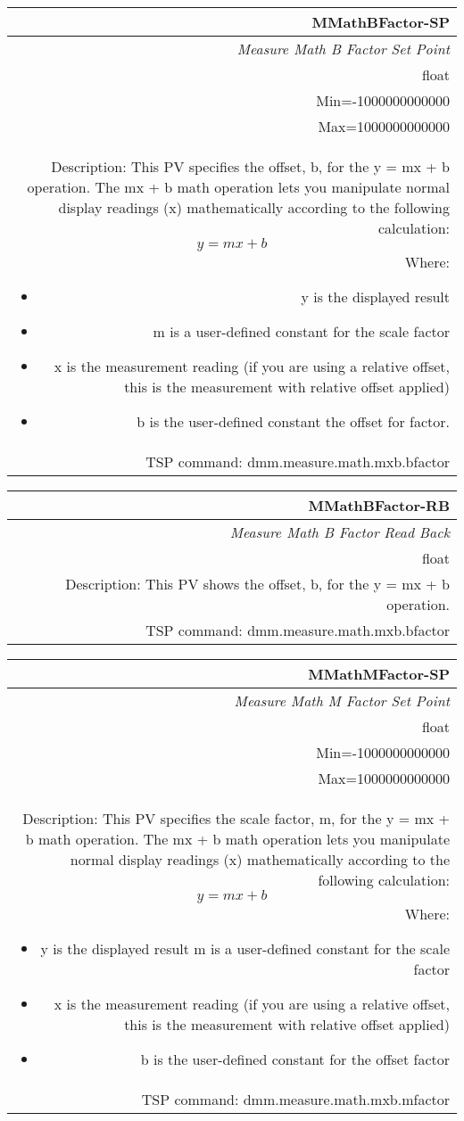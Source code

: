 \documentclass[openany]{article}
\begin{document}
		\begin{tabular}{N}
			\hline
			\bfseries MMathBFactor-SP\label{pv:mmathbfactor-sp} \\ \hline
			\emph{Measure Math B Factor Set Point} \\
			float \\
			Min=-1000000000000 \\
			Max=1000000000000 \\
			Description: This PV specifies the offset, b, for the y = mx + b operation. The mx + b math operation lets you manipulate normal display readings (x) mathematically according to the following calculation: $$y = mx + b$$ Where: \begin{itemize} \item y is the displayed result \item[] m is a user-defined constant for the scale factor \item x is the measurement reading (if you are using a relative offset, this is the measurement with relative offset applied) \item b is the user-defined constant the offset for factor. \end{itemize} \\
			TSP command: dmm.measure.math.mxb.bfactor
		\end{tabular}

		\begin{tabular}{N}
			\hline
			\bfseries MMathBFactor-RB\label{pv:mmathbfactor-rb} \\ \hline
			\emph{Measure Math B Factor Read Back} \\
			float \\
			Description: This PV shows the offset, b, for the y = mx + b operation. \\
			TSP command: dmm.measure.math.mxb.bfactor
		\end{tabular}

		\begin{tabular}{N}
			\hline
			\bfseries MMathMFactor-SP\label{pv:mmathmfactor-sp} \\ \hline
			\emph{Measure Math M Factor Set Point} \\
			float \\
			Min=-1000000000000 \\
			Max=1000000000000 \\
			Description: This PV specifies the scale factor, m, for the y = mx + b math operation. The mx + b math operation lets you manipulate normal display readings (x) mathematically according to the following calculation: $$y = mx + b$$ Where: \begin{itemize} \item y is the displayed result  m is a user-defined constant for the scale factor \item x is the measurement reading (if you are using a relative offset, this is the measurement with relative offset applied) \item b is the user-defined constant for the offset factor \end{itemize} \\
			TSP command: dmm.measure.math.mxb.mfactor
		\end{tabular}
\end{document}
